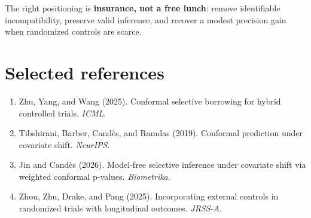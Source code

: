 \documentclass[10pt]{article}
\begin{document}
\begin{takeaway}
The right positioning is \textbf{insurance, not a free lunch}: remove identifiable incompatibility, preserve valid inference, and recover a modest precision gain when randomized controls are scarce.
\end{takeaway}

\section*{Selected references}
\small
\begin{enumerate}[leftmargin=1.7em,itemsep=0.12em]
\item Zhu, Yang, and Wang (2025). Conformal selective borrowing for hybrid controlled trials. \emph{ICML}.
\item Tibshirani, Barber, Cand\`es, and Ramdas (2019). Conformal prediction under covariate shift. \emph{NeurIPS}.
\item Jin and Cand\`es (2026). Model-free selective inference under covariate shift via weighted conformal p-values. \emph{Biometrika}.
\item Zhou, Zhu, Drake, and Pang (2025). Incorporating external controls in randomized trials with longitudinal outcomes. \emph{JRSS-A}.
\end{enumerate}
\end{document}
